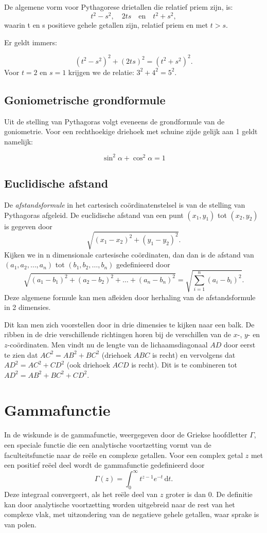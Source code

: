 \documentclass[11pt,a4paper]{amsart}
\begin{document}
De algemene vorm voor Pythagorese drietallen die relatief priem zijn, is:
\[t^2-s^2,\quad 2ts \quad \text{en}\quad  t^2+s^2,\]
waarin t en s positieve gehele getallen zijn, relatief priem en met \(t>s\).

Er geldt immers:

\[(t^2-s^2)^2+(2ts)^2 = (t^2+s^2)^2.\]
Voor \(t=2\) en \(s=1\) krijgen we de relatie: \(3^2 + 4^2 = 5^2\).

\subsection{Goniometrische grondformule}
Uit de stelling van Pythagoras volgt eveneens de grondformule van de 
goniometrie. Voor een rechthoekige driehoek met schuine zijde gelijk aan 1 
geldt namelijk:

\[\sin^2\alpha+\cos^2\alpha=1\]
\subsection{Euclidische afstand}

De \emph{afstandsformule} in het cartesisch coördinatenstelsel is van de 
stelling van 
Pythagoras afgeleid. De euclidische afstand 
van een punt \((x_1, y_1)\) tot \((x_2, 
y_2)\) is gegeven door
\[
 \sqrt{(x_1-x_2)^2 + (y_1-y_2)^2}. \]
Kijken we in n dimensionale cartesische coördinaten, dan dan is de afstand van 
\((a_1,a_2,\dots,a_n)\) tot \((b_1,b_2,\dots,b_n)\) gedefinieerd door
\[
\sqrt{(a_1-b_1)^2 + (a_2-b_2)^2 + \dots + (a_n-b_n)^2} = \sqrt{\sum_{i=1}^n 
(a_i-b_i)^2}.\]
Deze algemene formule kan men afleiden door herhaling van de afstandsformule in 
2 dimensies.

Dit kan men zich voorstellen door in drie dimensies te kijken naar een balk. De 
ribben in de drie verschillende richtingen horen bij 
de verschillen van de \(x\)-, \(y\)- en \(z\)-coördinaten. Men vindt nu de 
lengte van de 
lichaamsdiagonaal \(AD\) door eerst te zien dat \(AC^2 = AB^2 + BC^2\) 
(driehoek \(ABC\) is 
recht) en vervolgens dat \(AD^2 = AC^2 + CD ^2\) (ook driehoek \(ACD\) is 
recht). Dit 
is 
te combineren tot \(AD^2 = AB^2 + BC^2 + CD ^2\).

\section{Gammafunctie}
In de wiskunde is de gammafunctie, weergegeven door de Griekse hoofdletter \(\Gamma\), een speciale functie die een analytische voortzetting vormt van de faculteitsfunctie naar de reële en complexe getallen. Voor een complex getal \(z\) met een positief reëel deel wordt de gammafunctie gedefinieerd door
\begin{equation}
\label{eq-gamma}
\Gamma(z) = \int_0^{\infty} t^{z-1} e^{-t}\,\mathrm{d}t.
\end{equation}
Deze integraal convergeert, als het reële deel van \(z\) groter is dan 0. De definitie kan door analytische voortzetting worden uitgebreid naar de rest van het complexe vlak, met uitzondering van de negatieve gehele getallen, waar sprake is van polen.
\end{document}
